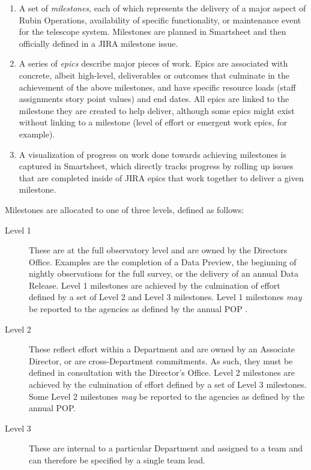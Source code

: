 \begin{itemize}
\begin{enumerate}
    \item A set of \emph{milestones}, each of which represents the delivery of a major aspect of Rubin Operations, availability of specific functionality, or maintenance event for the telescope system.
        Milestones are planned in Smartsheet and then officially defined in a \gls{JIRA} milestone issue.
    \item A series of \emph{epics} describe major pieces of work.
        Epics are associated with concrete, albeit high-level, deliverables or outcomes that culminate in the achievement of the above milestones, and have specific resource loads (staff assignments story point values) and end dates.
        All epics are linked to the milestone they are created to help deliver, although some epics might exist without linking to a milestone (level of effort or emergent work epics, for example).
    \item A visualization of progress on work done towards achieving milestones is captured in Smartsheet, which directly tracks progress by rolling up issues that are completed inside of \gls{JIRA} epics that work together to deliver a given milestone.
\end{enumerate}

Milestones are allocated to one of three levels, defined as follows:

\begin{description}
\item[Level 1] These are at the full observatory level and are owned by the Directors Office.
Examples are the completion of a Data Preview, the beginning of nightly observations for the full survey, or the delivery of an annual Data Release.
Level 1 milestones are achieved by the culmination of effort defined by a set of Level 2 and Level 3 milestones.
Level 1 milestones {\it may} be reported to the agencies as defined by the annual POP .
\item[Level 2] These reflect effort within a Department and are owned by an Associate Director, or are cross-Department commitments.
As such, they must be defined in consultation with the Director's Office.
Level 2 milestones are achieved by the culmination of effort defined by a set of Level 3 milestones.
Some Level 2 milestones {\it may} be reported to the agencies as defined by the annual POP.
\item[Level 3] These are internal to a particular Department and assigned to a team and can therefore be specified by a single team lead.
\end{description}


\end{itemize}
